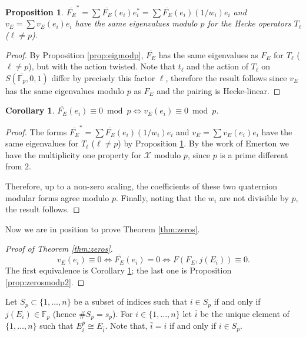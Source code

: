 \documentclass[13pt]{amsart}
\newtheorem{corollary}[theorem]{Corollary}
\newtheorem{proposition}[theorem]{Proposition}
\theoremstyle{remark}
\numberwithin{theorem}{section} \numberwithin{equation}{section}
\begin{document}
 \begin{proposition} \label{prop:sameeigenvalues}
 $\overline{F_{E}}^{*}=\sum  \overline{F_{E}}( e_i) e^{*}_{i}= \sum \overline{F_{E}}( e_i)(1/w_{i}) e_{i}$ and $v_{E}=\sum  {v_{E}}( e_i) e_{i}$ have the same eigenvalues modulo $p$ for the Hecke operators $T_{\ell}$ ($\ell \neq p$).
 
 \end{proposition}

\begin{proof}
 By Proposition \ref{prop:eigmodp}, $\overline{F_{E}}$ has the same eigenvalues as $F_{E}$ for $T_\ell$ ($\ell \neq p$), but with the action twisted.  
Note that $t_{\ell}$ and the action of $T_{\ell}$ on $S(\overline{\mathbb{F}_p},0,1)$ differ by precisely this factor $\ell$, therefore the result follows
since $v_{E}$ has the same eigenvalues modulo $p$ as $F_E$ and the pairing is Hecke-linear.
\end{proof}

\begin{corollary} \label{coro:last}
$\overline{F_{E}}( e_i) \equiv 0 \bmod{p}  \iff  {v_{E}}(e_i) \equiv 0  \bmod{p}$.
\end{corollary}

\begin{proof}
The forms $\overline{F_{E}}^{*}=\sum \overline{F_{E}}( e_i)(1/w_{i}) e_{i}$ and 
$v_{E}=\sum  {v_{E}}( e_i) e_{i}$ have the same eigenvalues
for $T_{\ell}$  ($\ell \neq p$) by Proposition \ref{prop:sameeigenvalues}. By 
the work of Emerton \cite[Theorem ~0.5 and Theorem ~1.14]{Emerton} we 
have the multiplicity one property for ${\mathcal{X}}$ modulo $p$, since $p$ is a prime 
different from $2$. 

Therefore, up to a non-zero scaling, the coefficients of these two quaternion 
modular forms agree modulo $p$. Finally, noting that the $w_{i}$ are not 
divisible by $p$,
the result follows.
\end{proof}

Now we are in position to prove Theorem \ref{thm:zeros}.
\begin{proof}[Proof of Theorem \ref{thm:zeros}]
 \[ {v_{E}}( e_i) \equiv 0 \iff  \overline{F_{E}}( e_i)=0  \iff  F(F_{E},j(E_{i})) \equiv 0 .   \]
 The first equivalence is Corollary \ref{coro:last}; the last one is 
Proposition \ref{prop:zerosmodp2}.
\end{proof}

Let $S_p \subset \{1,\ldots, n\}$ be a subset of indices such that $i \in S_p$ if and only if $j(E_i)\in {\mathbb{F}_p}$ (hence $\#S_p=s_p$). For $i \in \{1,\ldots, n\}$ let $\bar{i}$ be the unique element of $\{1,\ldots, n\}$  such that $E_i^p \cong E_{\bar{i}}$. Note that, $\bar{i}=i$ if and only if $i \in S_p$.
\end{document}
